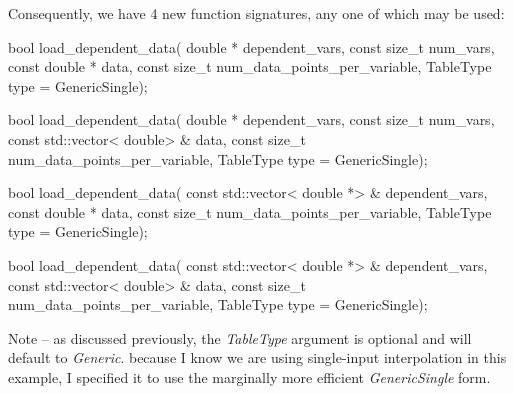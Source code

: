 \documentclass[11pt,fleqn]{report}
\begin{document}
Consequently, we have 4 new function signatures, any one of which may be used:
\begin{code}
  bool load_dependent_data(
           double       * dependent_vars,
           const size_t   num_vars,
           const double * data,
           const size_t   num_data_points_per_variable,
           TableType      type = GenericSingle);

  bool load_dependent_data(
           double       * dependent_vars,
           const size_t   num_vars,
           const std::vector< double> & data,
           const size_t   num_data_points_per_variable,
           TableType      type = GenericSingle);

  bool load_dependent_data(
           const std::vector< double *> & dependent_vars,
           const double * data,
           const size_t   num_data_points_per_variable,
           TableType      type = GenericSingle);

  bool load_dependent_data(
           const std::vector< double *> & dependent_vars,
           const std::vector< double>   & data,
           const size_t   num_data_points_per_variable,
           TableType      type = GenericSingle);
\end{code}

Note -- as discussed previously, the \textit{TableType} argument is optional
and will
default to \textit{Generic}. because I know we are using single-input
interpolation in this example, I specified it to use the marginally more
efficient \textit{GenericSingle} form.
\end{document}
